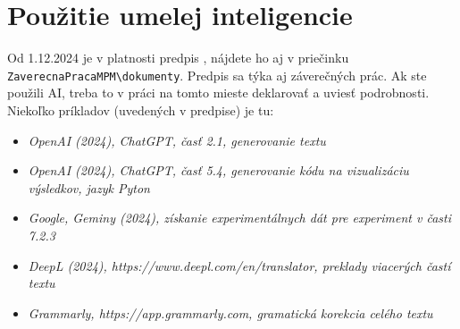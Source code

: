 \chapter*{Použitie umelej inteligencie}

Od 1.12.2024 je v platnosti predpis , nájdete ho aj v priečinku \verb|ZaverecnaPracaMPM\dokumenty|. Predpis sa týka aj záverečných prác. Ak ste použili AI, treba to v práci na tomto mieste deklarovať a uviesť podrobnosti. Niekoľko príkladov (uvedených v predpise) je tu:

\begin{itemize}
	\item \textit{OpenAI (2024), ChatGPT, časť 2.1, generovanie textu}
	
	\item \textit{OpenAI (2024), ChatGPT, časť 5.4, generovanie kódu na vizualizáciu výsledkov, jazyk Pyton}
	
	\item \textit{Google, Geminy (2024), získanie experimentálnych dát pre experiment v časti 7.2.3}
	
	\item \textit{DeepL (2024), https://www.deepl.com/en/translator, preklady viacerých častí textu}
	
	\item \textit{Grammarly, https://app.grammarly.com, gramatická korekcia celého textu}
\end{itemize}
	